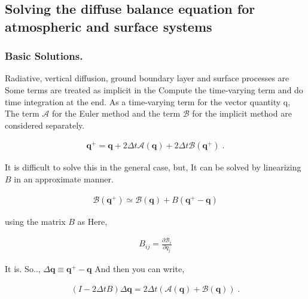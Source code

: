 \hypertarget{solving-the-diffuse-balance-equation-for-atmospheric-and-surface-systems}{%
\subsection{Solving the diffuse balance equation for atmospheric and
surface
systems}\label{solving-the-diffuse-balance-equation-for-atmospheric-and-surface-systems}}

\hypertarget{basic-solutions.}{%
\subsubsection{Basic Solutions.}\label{basic-solutions.}}

Radiative, vertical diffusion, ground boundary layer and surface
processes are Some terms are treated as implicit in the Compute the
time-varying term and do time integration at the end. As a time-varying
term for the vector quantity {q}, The term \({\mathcal A}\) for the
Euler method and the term \({\mathcal B}\) for the implicit method are
considered separately.

\begin{eqnarray}
  {\mathbf q}^+ 
      = {\mathbf q} + 2 \Delta t {\mathcal A}( {\mathbf q}   )
                           + 2 \Delta t {\mathcal B}( {\mathbf q}^+ ) \; . 
\end{eqnarray}

It is difficult to solve this in the general case, but, It can be solved
by linearizing \(B\) in an approximate manner.

\begin{eqnarray}
  {\mathcal B}( {\mathbf q}^+ ) 
                           \simeq {\mathcal B}( {\mathbf q} ) 
                            + B( {\mathbf q}^+ - {\mathbf q} )
\end{eqnarray}

using the matrix \(B\) as Here,

\begin{eqnarray}
  B_{ij} = \frac{\partial {\mathcal B}_i}{\partial q_j}
\end{eqnarray}

It is. So.., \(\Delta {\mathbf q} \equiv {\mathbf q}^+ - {\mathbf q}\)
And then you can write,

\begin{eqnarray}
  ( I - 2 \Delta t B ) \Delta {\mathbf q} 
      = 2 \Delta t \left(  {\mathcal A}( {\mathbf q} )
                         + {\mathcal B}( {\mathbf q} ) \right) \; . 
\end{eqnarray}

